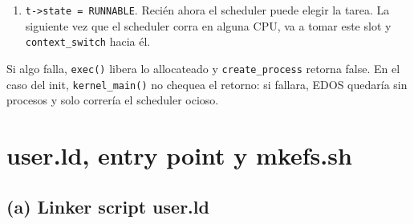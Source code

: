 \documentclass[11pt,a4paper]{article}
\begin{document}
\begin{enumerate}[leftmargin=1.6em]
\begin{enumerate}[label=\alph*),leftmargin=1.4em]
        \item Aloca la página del user-stack y la mapea en
        \texttt{PROC\_MAX\_VA - PAGE\_SIZE} con \texttt{PAGE\_R|W|U}. Así el stack
        usuario queda al tope del espacio de proceso.
        \item \texttt{setup\_main\_args(task, ustack + PAGE\_SIZE, args)}: empuja
        las cadenas y arma el array \texttt{char* argv[]}. Deja \texttt{argc} y
        \texttt{argv} en \texttt{a0}/\texttt{a1} del trap frame (a través de
        \texttt{put\_argument}).
        \item Inicializa el trap frame: \texttt{tf->sp = sp} (top del user-stack
        recién armado), \texttt{tf->pc = 0}. Esa \texttt{pc=0} corresponde al
        entry point \texttt{start()} del usuario (ver ej.\ 5).
        \item Si el task ya era un proceso (re-exec), libera la memoria del page
        table anterior con \texttt{unmap\_region(..., true)} y \texttt{free\_page}
        del page table viejo.
        \item \texttt{task->pgtbl = new\_pgtbl}.
        \item \texttt{task->ctx.sp = (size\_t) tf}. Acá está el truco: cuando el
        scheduler haga \texttt{context\_switch}, el \texttt{sp} del task quedará
        apuntando al trap frame en su kstack, y \texttt{u\_trap\_ret} va a leer
        todos los registros de ahí.
    \end{enumerate}
    \item \texttt{t->state = RUNNABLE}. Recién ahora el scheduler puede elegir la
    tarea. La siguiente vez que el scheduler corra en alguna CPU, va a tomar este
    slot y \texttt{context\_switch} hacia él.
\end{enumerate}

Si algo falla, \texttt{exec()} libera lo allocateado y \texttt{create\_process}
retorna false. En el caso del init, \texttt{kernel\_main()} no chequea el
retorno: si fallara, EDOS quedaría sin procesos y solo correría el scheduler
ocioso.

\section{user.ld, entry point y mkefs.sh}

\subsection*{(a) Linker script user.ld}
\end{document}
